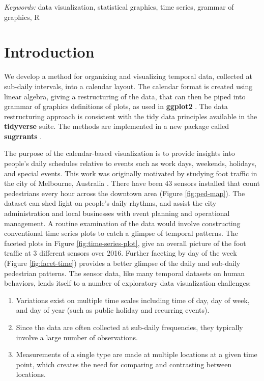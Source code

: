 \documentclass[12pt]{article}
\providecommand{\tightlist}{%
  \setlength{\itemsep}{0pt}\setlength{\parskip}{0pt}}
\begin{document}
\noindent%
{\it Keywords:} data visualization, statistical graphics, time series, grammar of graphics, R
\vfill

\newpage
{} %

\hypertarget{introduction}{%
\section{Introduction}\label{introduction}}

We develop a method for organizing and visualizing temporal data,
collected at sub-daily intervals, into a calendar layout. The calendar
format is created using linear algebra, giving a restructuring of the
data, that can then be piped into grammar of graphics definitions of
plots, as used in \textbf{ggplot2} \citep{R-ggplot2}. The data
restructuring approach is consistent with the tidy data principles
available in the \textbf{tidyverse} \citep{R-tidyverse} suite. The
methods are implemented in a new package called \textbf{sugrrants}
\citep{R-sugrrants} .

The purpose of the calendar-based visualization is to provide insights
into people's daily schedules relative to events such as work days,
weekends, holidays, and special events. This work was originally
motivated by studying foot traffic in the city of Melbourne, Australia
\citep{ped}. There have been 43 sensors installed that count pedestrians
every hour across the downtown area (Figure \ref{fig:ped-map}). The
dataset can shed light on people's daily rhythms, and assist the city
administration and local businesses with event planning and operational
management. A routine examination of the data would involve constructing
conventional time series plots to catch a glimpse of temporal patterns.
The faceted plots in Figure \ref{fig:time-series-plot}, give an overall
picture of the foot traffic at 3 different sensors over 2016. Further
faceting by day of the week (Figure \ref{fig:facet-time}) provides a
better glimpse of the daily and sub-daily pedestrian patterns. The
sensor data, like many temporal datasets on human behaviors, lends
itself to a number of exploratory data visualization challenges:

\begin{enumerate}
\def\labelenumi{\arabic{enumi}.}
\tightlist
\item
  Variations exist on multiple time scales including time of day, day of
  week, and day of year (such as public holiday and recurring events).
\item
  Since the data are often collected at sub-daily frequencies, they
  typically involve a large number of observations.
\item
  Measurements of a single type are made at multiple locations at a
  given time point, which creates the need for comparing and contrasting
  between locations.
\end{enumerate}
\end{document}
